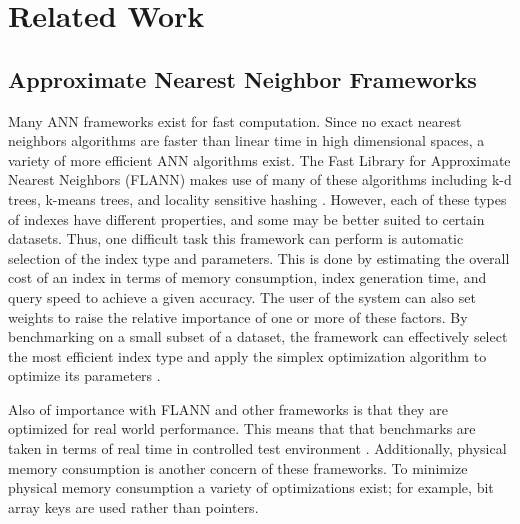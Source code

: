 \chapter{Related Work} %

\label{Related Work} %


\section{Approximate Nearest Neighbor Frameworks}

Many ANN frameworks exist for fast computation.  Since no exact nearest neighbors algorithms are faster than linear time in high dimensional spaces, a variety of more efficient ANN algorithms exist.  The Fast Library for Approximate Nearest Neighbors (FLANN) makes use of many of these algorithms including k-d trees, k-means trees, and locality sensitive hashing \citep{muja_flann_2009}.  However, each of these types of indexes have different properties, and some may be better suited to certain datasets.  Thus, one difficult task this framework can perform is automatic selection of the index type and parameters.  This is done by estimating the overall cost of an index in terms of memory consumption, index generation time, and query speed to achieve a given accuracy.  The user of the system can also set weights to raise the relative importance of one or more of these factors.  By benchmarking on a small subset of a dataset, the framework can effectively select the most efficient index type and apply the simplex optimization algorithm to optimize its parameters \citep{nelder1965simplex}.

Also of importance with FLANN and other frameworks is that they are optimized for real world performance.  This means that that benchmarks are taken in terms of real time in controlled test environment \citep{muja_flann_2009}.  Additionally, physical memory consumption is another concern of these frameworks.  To minimize physical memory consumption a variety of optimizations exist; for example, bit array keys are used rather than pointers.
